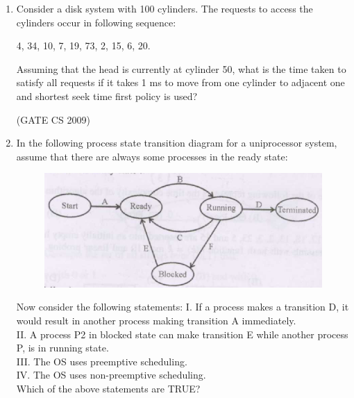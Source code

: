 \documentclass[a4paper, 11pt]{article}
\begin{document}
\begin{enumerate}
    \item Consider a disk system with 100 cylinders. The requests to access the cylinders occur in following sequence:
    \begin{center}
        4, 34, 10, 7, 19, 73, 2, 15, 6, 20.
    \end{center}
    Assuming that the head is currently at cylinder 50, what is the time taken to satisfy all requests if it takes 1 ms to move from one cylinder to adjacent one and shortest seek time first policy is used?\\
    \begin{enumerate}
    \end{enumerate}

    \hfill (GATE CS 2009)

    \item In the following process state transition diagram for a uniprocessor system, assume that there are always some processes in the ready state:\\
    \begin{figure}[H]
        \centering
        \includegraphics[width=\columnwidth]{figs/q32.png}
        \caption{}
        \label{fig:placeholder}
    \end{figure}

    Now consider the following statements:
    I. If a process makes a transition D, it would result in another process making transition A immediately.\\
    II. A process P2 in blocked state can make transition E while another process P, is in running state. \\
    III.  The OS uses preemptive scheduling. \\
    IV. The OS uses non-preemptive scheduling.\\
    Which of the above statements are TRUE?\\


\end{enumerate}
\end{document}

